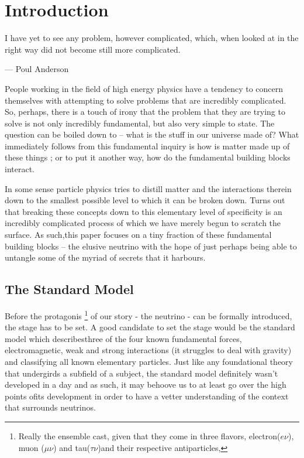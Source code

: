 \section{Introduction}

I have yet to see any problem, however complicated, which, when looked at in the right way did not become still more complicated.

\begin{flushright}--- Poul Anderson\end{flushright}

  People working in the field of high energy physics have a tendency to concern themselves with attempting to solve problems that are incredibly complicated.
  So, perhaps, there is a touch of irony that the problem that they are trying to solve is not only incredibly fundamental, but also very simple to state.
  The question can be boiled down to -- what is the stuff in our universe made of?
  What immediately follows from this fundamental inquiry is how is matter made up of these things ; or to put it another way, how do the fundamental building blocks interact.

  In some sense particle physics tries to distill matter and the interactions therein down to the smallest possible level to which it can be broken down.
  Turns out that breaking these concepts down to this elementary level of specificity is an incredibly complicated process of which we have merely begun to scratch the surface.
  As such,this paper focuses on a tiny fraction of these fundamental building blocks -- the elusive neutrino with the hope of just perhaps being able to untangle some of the myriad of secrets that it harbours.

  \subsection{The Standard Model}

  Before the protagonis
  \footnote{Really the ensemble cast, given that they come in three flavors, electron($e\nu$), muon ($\mu \nu$) and tau($\tau \nu$)and their respective antiparticles,}
  of our story - the neutrino - can be formally introduced, the stage has to be set.
  A good candidate to set the stage would be the standard model which describesthree of the four known fundamental forces, electromagnetic, weak and strong interactions (it struggles to deal with  gravity) and classifying all known elementary particles.
  Just like any foundational theory that undergirds a subfield of a subject, the standard model definitely wasn't developed in a day and as such, it may behoove us to at least go over the high points ofits development in order to have a vetter understanding of the context that surrounds neutrinos. 






